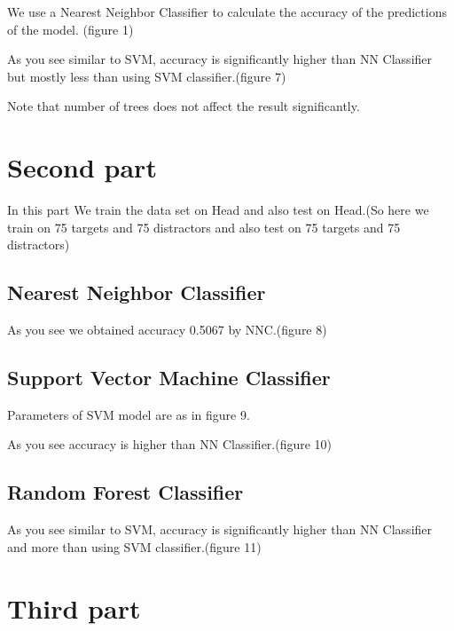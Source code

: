 \documentclass[9pt,twocolumn]{paper-template}
\begin{document}
We use a  Nearest Neighbor Classifier to calculate the accuracy of the predictions of the model. (figure 1)



As you see similar to SVM, accuracy is significantly higher than NN Classifier but mostly less than using SVM
classifier.(figure 7)

Note that number of trees does not affect the result significantly.








\newpage
	

\section*{Second part}
	
	
	
	In this part We train the data set on Head and also test on Head.(So here we train on 75 targets and 75 distractors and also test on 75 targets and 75 distractors)
	
		


\subsection*{Nearest Neighbor Classifier}



As you see we obtained accuracy 0.5067 by NNC.(figure 8)

\subsection*{Support Vector Machine Classifier}



Parameters of SVM model are as in figure 9.


As you see accuracy is higher than NN Classifier.(figure 10)

\subsection*{Random Forest Classifier}


As you see similar to SVM, accuracy is significantly higher than NN Classifier and more than using SVM
classifier.(figure 11)




\section*{Third part}
\end{document}
